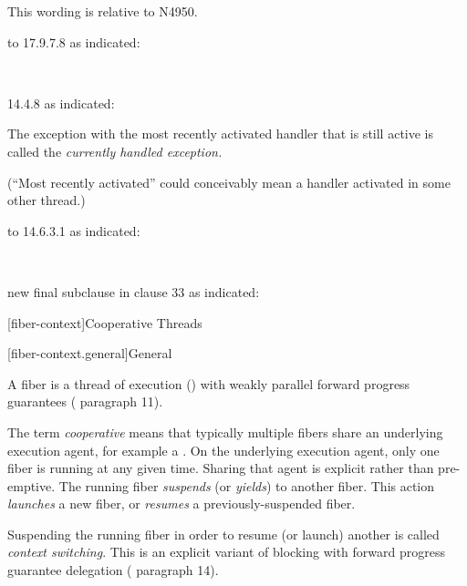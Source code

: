 \newpage
{}\label{api}

This wording is relative to N4950.\cite{Standard}

 to 17.9.7.8  as indicated:

\\

 14.4.8  as indicated:

The exception with the most recently activated handler that is still active is called the \emph{currently handled exception.}

(``Most recently activated'' could conceivably mean a handler activated in some
other thread.)

 to 14.6.3.1  as indicated:

\\

 new final subclause in clause 33  as indicated:

\setcounter{section}{33}
\setcounter{subsection}{10}

[fiber-context]{Cooperative Threads}

[fiber-context.general]{General}

A fiber is a thread of execution () with
weakly parallel forward progress guarantees ( paragraph 11).

The term \emph{cooperative} means that typically multiple fibers share an
underlying execution agent, for example a . On the
underlying execution agent, only one fiber is running at any given time. Sharing
that agent is explicit rather than pre-emptive. The running
fiber \emph{suspends} (or \emph{yields}) to another fiber. This
action \emph{launches} a new fiber, or \emph{resumes} a previously-suspended
fiber.

Suspending the running fiber in order to resume (or launch) another is
called \emph{context switching}. This is an explicit variant of blocking with
forward progress guarantee delegation ( paragraph 14).

